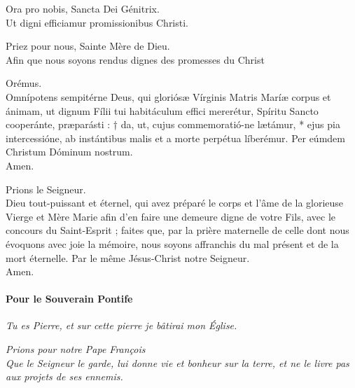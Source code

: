 \documentclass[twoside]{article}
\begin{document}
\begin{paracol}{2}

\vv Ora pro nobis, Sancta Dei Génitrix.\\
\rr Ut digni efficiamur promissionibus Christi.

\switchcolumn

\vv Priez pour nous, Sainte Mère de Dieu.\\
\rr Afin que nous soyons rendus dignes des promesses du Christ

\switchcolumn*

\vv Orémus.\\
Omnípotens sempitérne Deus, qui gloriósæ
Vírginis Matris Maríæ corpus et ánimam, ut
dignum Fílii tui habitáculum effici mererétur, 
Spíritu Sancto cooperánte, præparásti : †
da, ut, cujus commemoratió-ne lætámur, *
ejus pia intercessióne, ab instántibus malis et
a morte perpétua líberémur.
Per eúmdem Christum Dóminum nostrum.\\
\rr Amen.

\switchcolumn

\vv Prions le Seigneur.\\
Dieu tout-puissant et éternel, qui avez préparé le
corps et l’âme de la glorieuse Vierge et Mère
Marie afin d’en faire une demeure digne de votre 
Fils, avec le concours du Saint-Esprit ; faites que,
par la prière maternelle de celle dont nous évoquons avec joie la mémoire, nous soyons affranchis du mal présent et de la mort éternelle.
Par le même Jésus-Christ notre Seigneur.\\
\rr Amen.

\end{paracol}

\paragraph{Pour le Souverain Pontife}


\emph{Tu es Pierre, et sur cette pierre je bâtirai mon Église.}


\emph{\vv Prions pour notre Pape François\\
\rr Que le Seigneur le garde, lui donne vie et bonheur sur la terre, et ne le livre pas aux projets de ses ennemis.}
\end{document}
